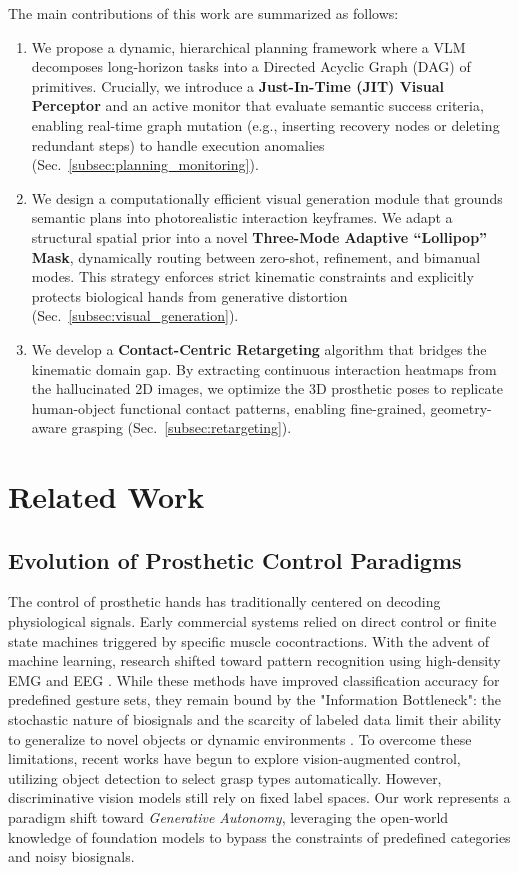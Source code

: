 \documentclass[letterpaper, 10 pt, conference]{ieeeconf}  %
\begin{document}
The main contributions of this work are summarized as follows:
\begin{enumerate}
    \item We propose a dynamic, hierarchical planning framework where a VLM decomposes long-horizon tasks into a Directed Acyclic Graph (DAG) of primitives. Crucially, we introduce a \textbf{Just-In-Time (JIT) Visual Perceptor} and an active monitor that evaluate semantic success criteria, enabling real-time graph mutation (e.g., inserting recovery nodes or deleting redundant steps) to handle execution anomalies (Sec.~\ref{subsec:planning_monitoring}).
    \item We design a computationally efficient visual generation module that grounds semantic plans into photorealistic interaction keyframes. We adapt a structural spatial prior into a novel \textbf{Three-Mode Adaptive ``Lollipop'' Mask}, dynamically routing between zero-shot, refinement, and bimanual modes. This strategy enforces strict kinematic constraints and explicitly protects biological hands from generative distortion (Sec.~\ref{subsec:visual_generation}).
    \item We develop a \textbf{Contact-Centric Retargeting} algorithm that bridges the kinematic domain gap. By extracting continuous interaction heatmaps from the hallucinated 2D images, we optimize the 3D prosthetic poses to replicate human-object functional contact patterns, enabling fine-grained, geometry-aware grasping (Sec.~\ref{subsec:retargeting}).
\end{enumerate}
\section{Related Work}
\label{sec:related_work}

\subsection{Evolution of Prosthetic Control Paradigms}
The control of prosthetic hands has traditionally centered on decoding physiological signals. Early commercial systems relied on direct control or finite state machines triggered by specific muscle cocontractions. With the advent of machine learning, research shifted toward pattern recognition using high-density EMG \cite{gijsberts2014movement, atzori2014characterization, atzori2015ninapro, capsi2025merging} and EEG \cite{flesher2021brain, pan2022review}. While these methods have improved classification accuracy for predefined gesture sets, they remain bound by the "Information Bottleneck": the stochastic nature of biosignals and the scarcity of labeled data limit their ability to generalize to novel objects or dynamic environments \cite{vujaklija2016new}.
To overcome these limitations, recent works have begun to explore vision-augmented control, utilizing object detection to select grasp types automatically. However, discriminative vision models still rely on fixed label spaces. Our work represents a paradigm shift toward \textit{Generative Autonomy}, leveraging the open-world knowledge of foundation models to bypass the constraints of predefined categories and noisy biosignals.
\end{document}
